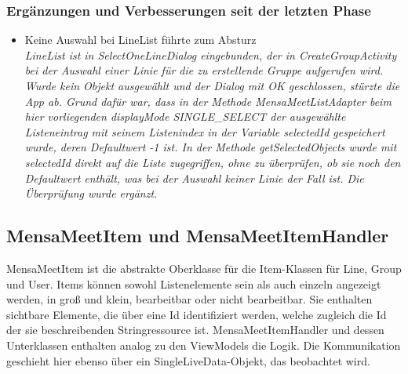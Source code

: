 \documentclass[a4paper]{scrreprt}
\begin{document}
\subsubsection{Ergänzungen und Verbesserungen seit der letzten Phase}
\begin{itemize}
\item Keine Auswahl bei LineList führte zum Absturz\\
\textit{LineList ist in SelectOneLineDialog eingebunden, der in CreateGroupActivity bei der Auswahl einer Linie für die zu erstellende Gruppe aufgerufen wird. Wurde kein Objekt ausgewählt und der Dialog mit OK geschlossen, stürzte die App ab. Grund dafür war, dass in der Methode MensaMeetListAdapter beim hier vorliegenden displayMode SINGLE\_SELECT der ausgewählte Listeneintrag mit seinem Listenindex in der Variable selectedId gespeichert wurde, deren Defaultwert -1 ist. In der Methode getSelectedObjects wurde mit selectedId direkt auf die Liste zugegriffen, ohne zu überprüfen, ob sie noch den Defaultwert enthält, was bei der Auswahl keiner Linie der Fall ist. Die Überprüfung wurde ergänzt.}

\end{itemize}

\subsection{MensaMeetItem und MensaMeetItemHandler}
MensaMeetItem ist die abstrakte Oberklasse für die Item-Klassen für Line, Group und User. Items können sowohl Listenelemente sein als auch einzeln angezeigt werden, in groß und klein, bearbeitbar oder nicht bearbeitbar. Sie enthalten sichtbare Elemente, die über eine Id identifiziert werden, welche zugleich die Id der sie beschreibenden Stringressource ist. MensaMeetItemHandler und dessen Unterklassen enthalten analog zu den ViewModels die Logik. Die Kommunikation geschieht hier ebenso über ein SingleLiveData-Objekt, das beobachtet wird.
\end{document}
